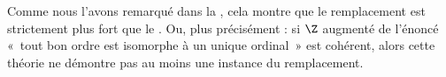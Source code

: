 \documentclass[../../../include/open-logic-section]{subfiles}
\begin{document}
Comme nous l'avons remarqué dans la
, cela montre
que le remplacement est strictement plus fort que le
.
Ou, plus précisément : si $\Z$ augmenté de l'énoncé
«~tout bon ordre est isomorphe à un unique ordinal~»
est cohérent, alors cette théorie ne démontre pas
au moins une instance du remplacement.

\end{document}
